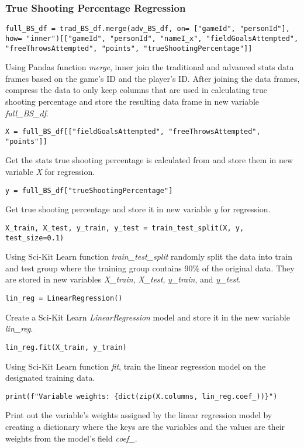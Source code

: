 \documentclass{article}
\begin{document}
\subsubsection{True Shooting Percentage Regression}
\begin{lstlisting}
full_BS_df = trad_BS_df.merge(adv_BS_df, on= ["gameId", "personId"], how= "inner")[["gameId", "personId", "nameI_x", "fieldGoalsAttempted", "freeThrowsAttempted", "points", "trueShootingPercentage"]]
\end{lstlisting}
Using Pandas function \textit{merge}, inner join the traditional and advanced stats data frames based on the game's ID and the player's ID. After joining the data frames, compress the data to only keep columns that are used in calculating true shooting percentage and store the resulting data frame in new variable \textit{full_BS_df}.
\begin{lstlisting}
X = full_BS_df[["fieldGoalsAttempted", "freeThrowsAttempted", "points"]]
\end{lstlisting}
Get the stats true shooting percentage is calculated from and store them in new variable \textit{X} for regression.
\begin{lstlisting}
y = full_BS_df["trueShootingPercentage"]
\end{lstlisting}
Get true shooting percentage and store it in new variable \textit{y} for regression.
\begin{lstlisting}
X_train, X_test, y_train, y_test = train_test_split(X, y, test_size=0.1)
\end{lstlisting}
Using Sci-Kit Learn function \textit{train_test_split} randomly split the data into train and test group where the training group contains 90\% of the original data. They are stored in new variables \textit{X_train}, \textit{X_test}, \textit{y_train}, and \textit{y_test}.
\begin{lstlisting}
lin_reg = LinearRegression()
\end{lstlisting}
Create a Sci-Kit Learn \textit{LinearRegression} model and store it in the new variable \textit{lin_reg}.
\begin{lstlisting}
lin_reg.fit(X_train, y_train)
\end{lstlisting}
Using Sci-Kit Learn function \textit{fit}, train the linear regression model on the designated training data.
\begin{lstlisting}
print(f"Variable weights: {dict(zip(X.columns, lin_reg.coef_))}")
\end{lstlisting}
Print out the variable's weights assigned by the linear regression model by creating a dictionary where the keys are the variables and the values are their weights from the model's field \textit{coef_}.
\end{document}
